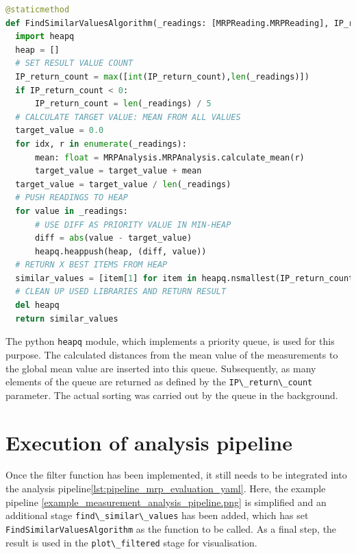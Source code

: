 \begin{lstlisting}[language=Python, caption={User implemented custom find most similar readings algorithm}, label=lst:custom_find_similar_values_algorithm]
@staticmethod
def FindSimilarValuesAlgorithm(_readings: [MRPReading.MRPReading], IP_return_count: int = -1) -> [MRPReading.MRPReading]:
  import heapq
  heap = []
  # SET RESULT VALUE COUNT
  IP_return_count = max([int(IP_return_count),len(_readings)])
  if IP_return_count < 0:
      IP_return_count = len(_readings) / 5
  # CALCULATE TARGET VALUE: MEAN FROM ALL VALUES
  target_value = 0.0
  for idx, r in enumerate(_readings):
      mean: float = MRPAnalysis.MRPAnalysis.calculate_mean(r)
      target_value = target_value + mean
  target_value = target_value / len(_readings)
  # PUSH READINGS TO HEAP
  for value in _readings:
      # USE DIFF AS PRIORITY VALUE IN MIN-HEAP
      diff = abs(value - target_value)
      heapq.heappush(heap, (diff, value))
  # RETURN X BEST ITEMS FROM HEAP
  similar_values = [item[1] for item in heapq.nsmallest(IP_return_count, heap)]
  # CLEAN UP USED LIBRARIES AND RETURN RESULT
  del heapq
  return similar_values
\end{lstlisting}

The python \passthrough{\lstinline!heapq!}\cite{heapq} module, which
implements a priority queue, is used for this purpose. The calculated
distances from the mean value of the measurements to the global mean
value are inserted into this queue. Subsequently, as many elements of
the queue are returned as defined by the
\passthrough{\lstinline!IP\_return\_count!} parameter. The actual
sorting was carried out by the queue in the background.

\hypertarget{execution-of-analysis-pipeline}{%
\section{Execution of analysis
pipeline}\label{execution-of-analysis-pipeline}}

Once the filter function has been implemented, it still needs to be
integrated into the analysis
pipeline\ref{lst:pipeline_mrp_evaluation_yaml}. Here, the example
pipeline \ref{example_measurement_analysis_pipeline.png} is simplified
and an additional stage \passthrough{\lstinline!find\_similar\_values!}
has been added, which has set
\passthrough{\lstinline!FindSimilarValuesAlgorithm!} as the function to
be called. As a final step, the result is used in the
\passthrough{\lstinline!plot\_filtered!} stage for visualisation.

